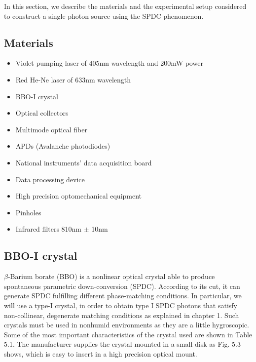 \documentclass[12pt]{book}
\begin{document}
In this section, we describe the materials and the experimental setup considered to construct a single photon source using the SPDC phenomenon.


\subsection{Materials}

\begin{itemize}



\item Violet pumping laser of 405nm wavelength and 200mW power
\item Red He-Ne laser of 633nm wavelength
\item BBO-I crystal
\item Optical collectors
\item Multimode optical fiber
\item APDs (Avalanche photodiodes)
\item National instruments' data acquisition board
\item Data processing device
\item High precision optomechanical equipment
\item Pinholes
\item Infrared filters 810nm $\pm$ 10nm
\end{itemize}

\subsection{BBO-I crystal}
$\beta$-Barium borate (BBO) is a nonlinear optical crystal able to produce spontaneous parametric down-conversion (SPDC). According to its cut, it can generate SPDC fulfilling different phase-matching conditions. In particular, we will use a type-I crystal, in order to obtain type I SPDC photons that satisfy non-collinear, degenerate matching conditions as explained in chapter 1. Such crystals must be used in nonhumid environments as they are a little hygroscopic. Some of the most important characteristics of the crystal used are shown in Table 5.1. The manufacturer supplies the crystal mounted in a small disk as Fig. 5.3 shows, which is easy to insert in a high precision optical mount.
 
\end{document}
